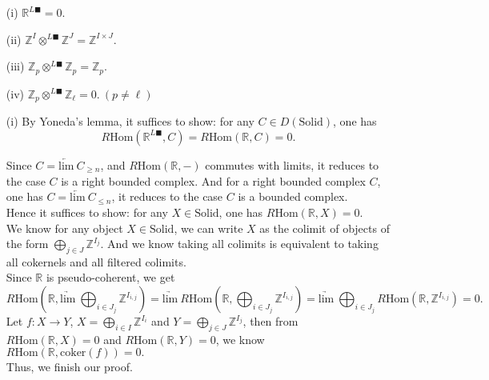 \documentclass[UTF8,12,a4paper]{ctexart}
\theoremstyle{definition}
\begin{document}
\prop 
\begin{itemize}
	\item [(i)] $\mathbb{R}^{L\blacksquare}=0.$
	\item [(ii)] $\mathbb{Z}^I\otimes^{L\blacksquare} \mathbb{Z}^J=\mathbb{Z}^{I\times J}.$
	\item [(iii)] $\mathbb{Z}_p\otimes^{L\blacksquare}\mathbb{Z}_p=\mathbb{Z}_p.$
	\item [(iv)]$\mathbb{Z}_p\otimes^{L\blacksquare}\mathbb{Z}_\ell=0.\ (p\neq \ell)$
\end{itemize}
\pf 
\begin{itemize}
	\item [(i)]
	By Yoneda's lemma, it suffices to show: for any $
	C\in D(\text{Solid})$, one has 
	$$
	R\text{Hom}(\mathbb{R}^{L\blacksquare},C)=
	R\text{Hom}(\mathbb{R},C)=0.
	$$
	
	Since $C=\underleftarrow{\text{lim}}\ C_{\geq n}$, and $R\text{Hom}(\mathbb{R},-)$ commutes with limits, it reduces to the case $C$ is a right bounded complex. And for a right bounded complex $C$, one has $C=\underleftarrow{\text{lim}}\ C_{\leq n}$, it reduces to the case $C$ is a bounded complex.\\
	 Hence it suffices to show: for any $X\in \text{Solid}$, one has $R\text{Hom}(\mathbb{R},X)=0.$ \\
	We know for any object $X\in \text{Solid}$, we can write $X$ as the colimit of objects of the form $\bigoplus_{j\in J}\mathbb{Z}^{I_j}.$ And we know taking all colimits is equivalent to taking all cokernels and all filtered colimits.\\
	Since $\mathbb{R}$ is pseudo-coherent, we get 
	$$
	R\text{Hom}(\mathbb{R},\underrightarrow{\text{lim}}\  \bigoplus_{i\in J_j}\mathbb{Z}^{I_{i,j}})=\underrightarrow{\text{lim}}\ 
		R\text{Hom}(\mathbb{R},\bigoplus_{i\in J_j}\mathbb{Z}^{I_{i,j}})=\underrightarrow{\text{lim}}\ \bigoplus_{i\in J_j}
		R\text{Hom}(\mathbb{R},\mathbb{Z}^{I_{i,j}})=0.
	$$
	Let $f:X\rightarrow Y$, $X=\bigoplus_{i\in I}\mathbb{Z}^{I_i}$ and $Y=\bigoplus_{j\in J}\mathbb{Z}^{I_j}$, then from $R\text{Hom}(\mathbb{R},X)=0$ and $R\text{Hom}(\mathbb{R},Y)=0$, we know $R\text{Hom}(\mathbb{R},\text{coker}(f))=0.$\\
	Thus, we finish our proof.
	

\end{itemize}
\end{document}
